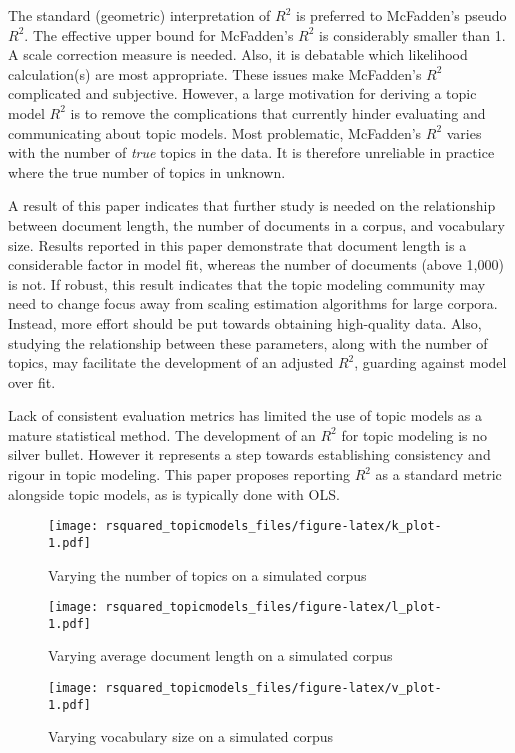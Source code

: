 \documentclass[conference,final,]{IEEEtran}
\makeatletter
\def\maxwidth{\ifdim\Gin@nat@width>\linewidth\linewidth
\else\Gin@nat@width\fi}
\let\Oldincludegraphics\includegraphics
\renewcommand{\includegraphics}[1]{\Oldincludegraphics[width=\maxwidth]{#1}}
\makeatother
\begin{document}
The standard (geometric) interpretation of \(R^2\) is preferred to
McFadden's pseudo \(R^2\). The effective upper bound for McFadden's
\(R^2\) is considerably smaller than 1. A scale correction measure is
needed. Also, it is debatable which likelihood calculation(s) are most
appropriate. These issues make McFadden's \(R^2\) complicated and
subjective. However, a large motivation for deriving a topic model
\(R^2\) is to remove the complications that currently hinder evaluating
and communicating about topic models. Most problematic, McFadden's
\(R^2\) varies with the number of \textit{true} topics in the data. It
is therefore unreliable in practice where the true number of topics in
unknown.

A result of this paper indicates that further study is needed on the
relationship between document length, the number of documents in a
corpus, and vocabulary size. Results reported in this paper demonstrate
that document length is a considerable factor in model fit, whereas the
number of documents (above 1,000) is not. If robust, this result
indicates that the topic modeling community may need to change focus
away from scaling estimation algorithms for large corpora. Instead, more
effort should be put towards obtaining high-quality data. Also, studying
the relationship between these parameters, along with the number of
topics, may facilitate the development of an adjusted \(R^2\), guarding
against model over fit.

Lack of consistent evaluation metrics has limited the use of topic
models as a mature statistical method. The development of an \(R^2\) for
topic modeling is no silver bullet. However it represents a step towards
establishing consistency and rigour in topic modeling. This paper
proposes reporting \(R^2\) as a standard metric alongside topic models,
as is typically done with OLS.

\begin{figure}
\centering
\texttt{[image: rsquared\_topicmodels\_files/figure-latex/k\_plot-1.pdf]}
\caption{Varying the number of topics on a simulated corpus}
\end{figure}

\begin{figure}
\centering
\texttt{[image: rsquared\_topicmodels\_files/figure-latex/l\_plot-1.pdf]}
\caption{Varying average document length on a simulated corpus}
\end{figure}

\begin{figure}
\centering
\texttt{[image: rsquared\_topicmodels\_files/figure-latex/v\_plot-1.pdf]}
\caption{Varying vocabulary size on a simulated corpus}
\end{figure}
\end{document}
